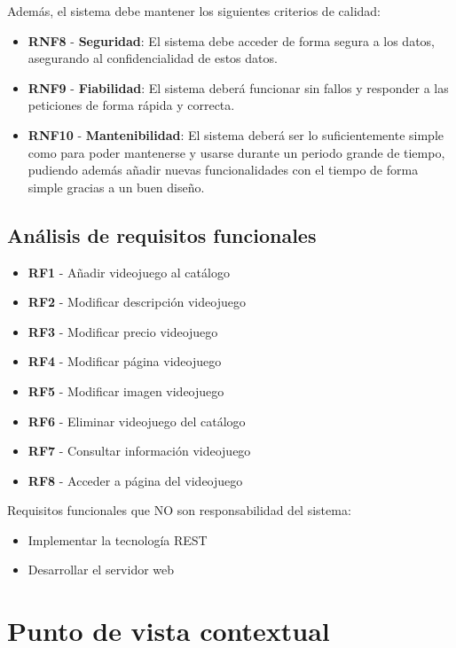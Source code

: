 \documentclass[11pt, spanish]{article}
\begin{document}
Además, el sistema debe mantener los siguientes criterios de calidad:

\begin{itemize}
\item \textbf{RNF8} - \textbf{Seguridad}: El sistema debe acceder de forma segura a los datos, asegurando al confidencialidad de estos datos.

\item \textbf{RNF9} - \textbf{Fiabilidad}: El sistema deberá funcionar sin fallos y responder a las peticiones de forma rápida y correcta.

\item \textbf{RNF10} - \textbf{Mantenibilidad}: El sistema deberá ser lo suficientemente simple como para poder mantenerse y usarse durante un periodo grande de tiempo, pudiendo además añadir nuevas funcionalidades con el tiempo de forma simple gracias a un buen diseño.
\end{itemize}

\subsection{Análisis de requisitos funcionales}

\begin{itemize}
\item \textbf{RF1} - Añadir videojuego al catálogo
\item \textbf{RF2} - Modificar descripción videojuego
\item \textbf{RF3} - Modificar precio videojuego
\item \textbf{RF4} - Modificar página videojuego
\item \textbf{RF5} - Modificar imagen videojuego
\item \textbf{RF6} - Eliminar videojuego del catálogo
\item \textbf{RF7} - Consultar información videojuego
\item \textbf{RF8} - Acceder a página del videojuego
\end{itemize}

Requisitos funcionales que NO son responsabilidad del sistema:

\begin{itemize}
\item Implementar la tecnología REST
\item Desarrollar el servidor web
\end{itemize}

\section{Punto de vista contextual}
\end{document}
